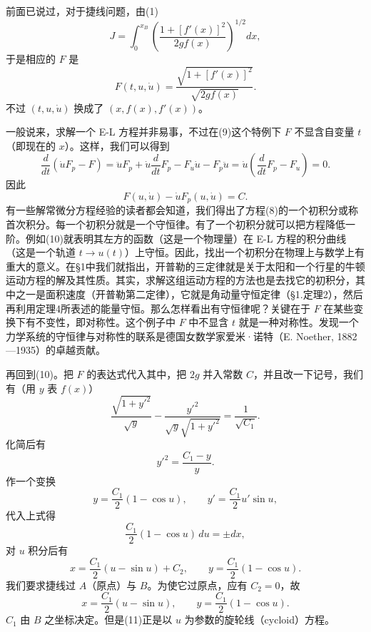 前面已说过，对于捷线问题，由(1)
\[
 J=\int_0^{x_B}\left(\frac{1+[f'(x)]^2}{2gf(x)}\right)^{1/2}dx,
\]
于是相应的 $F$ 是
\begin{equation}
 F(t,u,\dot u)=\frac{\sqrt{1+[f'(x)]^2}}{\sqrt{2gf(x)}}.
 \tag{9}
\end{equation}
不过 $(t,u,\dot u)$ 换成了 $(x,f(x),f'(x))$。

一般说来，求解一个 E-L 方程并非易事，不过在(9)这个特例下 $F$ 不显含自变量 $t$（即现在的 $x$）。这样，我们可以得到
\[
 \frac d{dt}(\dot uF_p-F)
 =\ddot uF_p+\dot u\frac d{dt}F_p-F_u\dot u-F_p\ddot u
 =\dot u\left(\frac d{dt}F_p-F_u\right)=0.
\]
因此
\begin{equation}
 F(u,\dot u)-\dot uF_p(u,\dot u)=C.
 \tag{10}
\end{equation}
有一些解常微分方程经验的读者都会知道，我们得出了方程(8)的一个初积分或称首次积分。每一个初积分就是一个守恒律。有了一个初积分就可以把方程降低一阶。例如(10)就表明其左方的函数（这是一个物理量）在 E-L 方程的积分曲线（这是一个轨道 $t\to u(t)$）上守恒。因此，找出一个初积分在物理上与数学上有重大的意义。在§1中我们就指出，开普勒的三定律就是关于太阳和一个行星的牛顿运动方程的解及其性质。其实，求解这组运动方程的方法也是去找它的初积分，其中之一是面积速度（开普勒第二定律），它就是角动量守恒定律（§1.定理2），然后再利用定理4所表述的能量守恒。那么怎样看出有守恒律呢？关键在于 $F$ 在某些变换下有不变性，即对称性。这个例子中 $F$ 中不显含 $t$ 就是一种对称性。发现一个力学系统的守恒律与对称性的联系是德国女数学家爱米·诺特（E. Noether, 1882—1935）的卓越贡献。

再回到(10)。把 $F$ 的表达式代入其中，把 $2g$ 并入常数 $C$，并且改一下记号，我们有（用 $y$ 表 $f(x)$）
\[
 \frac{\sqrt{1+y'^2}}{\sqrt y}
 -\frac{y'^2}{\sqrt y\sqrt{1+y'^2}}
 =\frac1{\sqrt{C_1}}.
\]
化简后有
\[
 y'^2=\frac{C_1-y}{y}.
\]
作一个变换
\[
 y=\frac{C_1}{2}(1-\cos u),
 \qquad
 y'=\frac{C_1}{2}u'\sin u,
\]
代入上式得
\[
 \frac{C_1}{2}(1-\cos u)\,du=\pm dx,
\]
对 $u$ 积分后有
\[
 x=\frac{C_1}{2}(u-\sin u)+C_2,
 \qquad
 y=\frac{C_1}{2}(1-\cos u).
\]
我们要求捷线过 $A$（原点）与 $B$。为使它过原点，应有 $C_2=0$，故
\begin{equation}
 x=\frac{C_1}{2}(u-\sin u),
 \qquad
 y=\frac{C_1}{2}(1-\cos u).
 \tag{11}
\end{equation}
$C_1$ 由 $B$ 之坐标决定。但是(11)正是以 $u$ 为参数的旋轮线（cycloid）方程。

